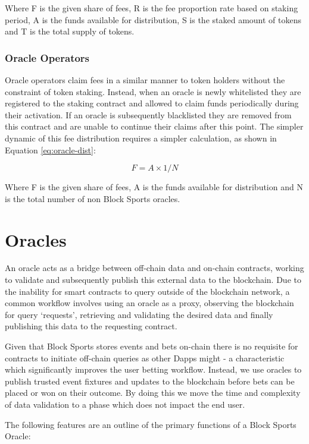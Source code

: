 \documentclass{article}
\begin{document}
Where F is the given share of fees, R is the fee proportion rate based on staking period, A is the funds available for distribution, S is the staked amount of tokens and T is the total supply of tokens.

		\subsubsection{Oracle Operators}
Oracle operators claim fees in a similar manner to token holders without the constraint of token staking. Instead, when an oracle is newly whitelisted they are registered to the staking contract and allowed to claim funds periodically during their activation. If an oracle is subsequently blacklisted they are removed from this contract and are unable to continue their claims after this point. The simpler dynamic of this fee distribution requires a simpler calculation, as shown in Equation \ref{eq:oracle-dist}:

\begin{equation}
F = A\times 1/N\label{eq:oracle-dist}
\end{equation}

Where F is the given share of fees, A is the funds available for distribution and N is the total number of non Block Sports oracles.

\section{Oracles}
An oracle acts as a bridge between off-chain data and on-chain contracts, working to validate and subsequently publish this external data to the blockchain. Due to the inability for smart contracts to query outside of the blockchain network, a common workflow involves using an oracle as a proxy, observing the blockchain for query ‘requests’, retrieving and validating the desired data and finally publishing this data to the requesting contract. 

Given that Block Sports stores events and bets on-chain there is no requisite for contracts to initiate off-chain queries as other Dapps might - a characteristic which significantly improves the user betting workflow. Instead, we use oracles to publish trusted event fixtures and updates to the blockchain before bets can be placed or won on their outcome. By doing this we move the time and complexity of data validation to a phase which does not impact the end user. 

The following features are an outline of the primary functions of a Block Sports Oracle:
\end{document}
